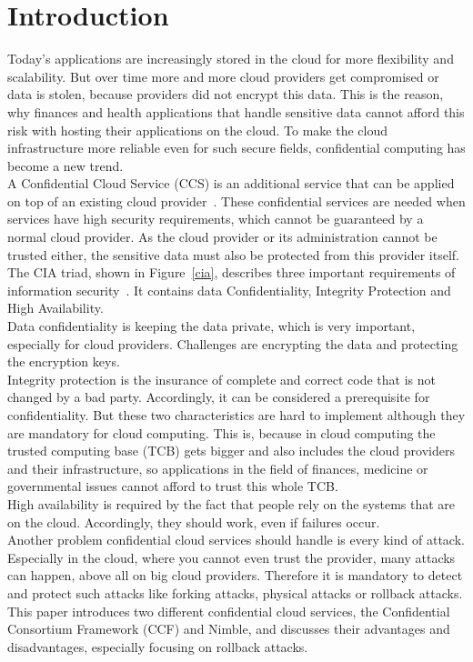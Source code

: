 


\section{Introduction}
Today's applications are increasingly stored in the cloud for more flexibility and scalability. 
 But over time more and more cloud providers get compromised or data is stolen, because providers did not encrypt this data. This is the reason, why finances and health applications that handle sensitive data cannot afford this risk with hosting their applications on the cloud. To make the cloud infrastructure more reliable even for such secure fields, confidential computing has become a new trend.\\
 A Confidential Cloud Service (CCS) is an additional service that can be applied on top of an existing cloud provider~\cite{confidentiality}. These confidential services are needed when services have high security requirements, which cannot be guaranteed by a normal cloud provider. As the cloud provider or its administration cannot be trusted either, the sensitive data must also be protected from this provider itself. \\
 The CIA triad,  shown in Figure~\ref{cia},  describes three important requirements of information security~\cite{ciaBook, cia}. It contains data Confidentiality, Integrity Protection and High Availability.\\
 Data confidentiality is keeping the data private, which is very important, especially for cloud providers. Challenges are encrypting the data and protecting the encryption keys.\\
 Integrity protection is the insurance of complete and correct code that is not changed by a bad party. Accordingly, it can be considered a prerequisite for confidentiality. But these two characteristics are hard to implement although they are mandatory for cloud computing. This is, because in cloud computing the trusted computing base (TCB) gets bigger and also includes the cloud providers and their infrastructure, so applications in the field of finances, medicine or governmental issues cannot afford to trust this whole TCB.\\
 High availability is required by the fact that people rely on the systems that are on the cloud. Accordingly, they should work, even if failures occur.\\
 Another problem confidential cloud services should handle is every kind of attack. Especially in the cloud, where you cannot even trust the provider, many attacks can happen, above all on big cloud providers. Therefore it is mandatory to detect and protect such attacks like forking attacks, physical attacks or rollback attacks.\\
 This paper introduces two different confidential cloud services, the Confidential Consortium Framework (CCF) and Nimble,  and discusses their advantages and disadvantages, especially focusing on rollback attacks. 
	 
